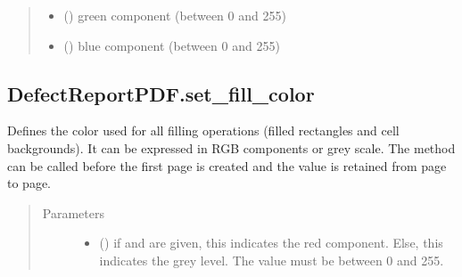 \documentclass[letterpaper,10pt,english]{sphinxmanual}
\begin{document}
\begin{fulllineitems}
\begin{fulllineitems}
\begin{quote}
\begin{description}
\begin{itemize}
\item {} 
\sphinxAtStartPar
{} () \textendash{} green component (between 0 and 255)

\item {} 
\sphinxAtStartPar
{} () \textendash{} blue component (between 0 and 255)

\end{itemize}

\end{description}\end{quote}

\end{fulllineitems}



\subsection{DefectReportPDF.set\_fill\_color}
\label{\detokenize{generated/quality_assessment.quality_pdf_report.DefectReportPDF.set_fill_color:defectreportpdf-set-fill-color}}\label{\detokenize{generated/quality_assessment.quality_pdf_report.DefectReportPDF.set_fill_color::doc}}

\begin{fulllineitems}
\label{\detokenize{generated/quality_assessment.quality_pdf_report.DefectReportPDF.set_fill_color:quality_assessment.quality_pdf_report.DefectReportPDF.set_fill_color}}
\sphinxAtStartPar
Defines the color used for all filling operations (filled rectangles and cell backgrounds).
It can be expressed in RGB components or grey scale.
The method can be called before the first page is created and the value is retained from page to page.
\begin{quote}\begin{description}
\item[{Parameters}] \leavevmode\begin{itemize}
\item {} 
\sphinxAtStartPar
{} () \textendash{} if  and  are given, this indicates the red component.
Else, this indicates the grey level. The value must be between 0 and 255.


\end{itemize}
\end{description}
\end{quote}
\end{fulllineitems}
\end{fulllineitems}
\end{document}
